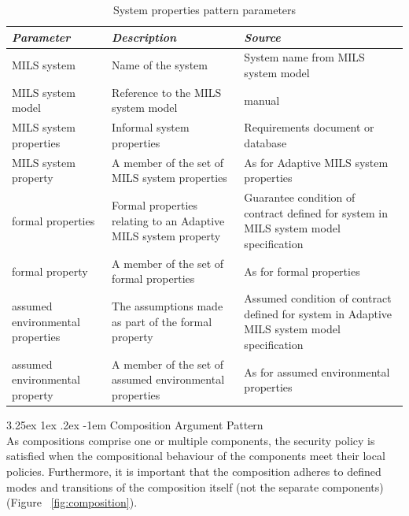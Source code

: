 \documentclass[12pt,twoside,a4paper]{article}
\makeatletter
\renewcommand\paragraph{\@startsection{paragraph}{5}{\z@}%
  {3.25ex \@plus1ex \@minus.2ex}%
  {-1em}%
  {\normalfont\normalsize\bfseries}}
\makeatother
\begin{document}
\begin{table}[htbp]
    \centering
    \caption{System properties pattern parameters}
    \begin{tabularx}{\textwidth}{| X | X | X |}
        \hline
        \textit{\textbf{Parameter}}     & \textit{\textbf{Description}}    & \textit{\textbf{Source}}     \\ \hline
        MILS system        & Name of the system       & System name from MILS system model         \\ \hline
        MILS system model         & Reference to the MILS system model       & manual        \\ \hline
        MILS system properties       & Informal system properties       & Requirements document or database       \\ \hline
        MILS system property       & A member of the set of MILS system properties       & As for Adaptive MILS system properties       \\ \hline
        formal properties       & Formal properties relating to an Adaptive MILS system property      & Guarantee condition of contract defined for system in MILS system model specification       \\ \hline
        formal property       & A member of the set of formal properties       & As for formal properties       \\ \hline
        assumed environmental properties      & The assumptions made as part of the formal property       & Assumed condition of contract defined for system in Adaptive MILS system model specification       \\ \hline
        assumed environmental property      & A member of the set of assumed environmental properties      & As for assumed environmental properties      \\ \hline
    \end{tabularx}
    \label{tab:sys_props_params}
\end{table}

\clearpage
\paragraph{Composition Argument Pattern}
~\\

As compositions comprise one or multiple components, the security policy is satisfied when the compositional behaviour of the components meet their local policies. Furthermore, it is important that the composition adheres to defined modes and transitions of the composition itself (not the separate components) (Figure ~\ref{fig:composition}).
\end{document}
